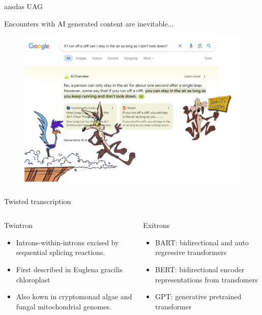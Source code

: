 \documentclass[10pt]{beamer}
\begin{document}
 






\begin{frame}[standout]{aasdas}
UAG
\end{frame}


\begin{frame}{Encounters with AI generated content are inevitable...}
	\begin{figure}
		\hspace*{-1cm} 
		\includegraphics[height=0.97\textheight]{figures/Cliffs.png}
	\end{figure}
\end{frame}


\begin{frame}{Twisted transcription}
\begin{columns}[T,onlytextwidth]
	
	\begin{alertblock}{Twintron}
		\begin{itemize}
			\item Introns-within-introns excised by sequential splicing reactions. 
			\item First described in Euglena gracilis chloroplast
			\item Also kown in cryptomonad algae and fungal mitochondrial genomes.
		\end{itemize}
	\end{alertblock}

		
	\begin{alertblock}{Exitrons}
		\begin{itemize}
			\item BART: bidirectional and auto regressive transformers
			\item BERT: bidirectional encoder representations from transfomers
			\item GPT: generative pretrained transformer
		\end{itemize}

	\end{alertblock}
\end{columns}
\end{frame}
\end{document}
